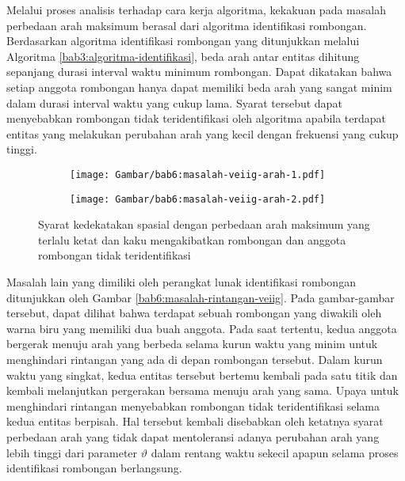 Melalui proses analisis terhadap cara kerja algoritma, kekakuan pada masalah perbedaan arah maksimum berasal dari algoritma identifikasi rombongan. Berdasarkan algoritma identifikasi rombongan yang ditunjukkan melalui Algoritma \ref{bab3:algoritma-identifikasi}, beda arah antar entitas dihitung sepanjang durasi interval waktu minimum rombongan. Dapat dikatakan bahwa setiap anggota rombongan hanya dapat memiliki beda arah yang sangat minim dalam durasi interval waktu yang cukup lama. Syarat tersebut dapat menyebabkan rombongan tidak teridentifikasi oleh algoritma apabila terdapat entitas yang melakukan perubahan arah yang kecil dengan frekuensi yang cukup tinggi.

\begin{figure}[t]
    \centering
    \captionsetup{width=.75\textwidth}
    \begin{subfigure}[b]{0.25\textwidth}
        \centering
        \texttt{[image: Gambar/bab6:masalah-veiig-arah-1.pdf]}
    \end{subfigure}
    \begin{subfigure}[b]{0.25\textwidth}
        \centering
        \texttt{[image: Gambar/bab6:masalah-veiig-arah-2.pdf]}
    \end{subfigure}
    \caption[Masalah perbedaan arah maksimum pada data VEIIG]{Syarat kedekatakan spasial dengan perbedaan arah maksimum yang terlalu ketat dan kaku mengakibatkan rombongan dan anggota rombongan tidak teridentifikasi}
    \label{bab6:masalah-veiig-arah}
\end{figure}

Masalah lain yang dimiliki oleh perangkat lunak identifikasi rombongan ditunjukkan oleh Gambar \ref{bab6:masalah-rintangan-veiig}. Pada gambar-gambar tersebut, dapat dilihat bahwa terdapat sebuah rombongan yang diwakili oleh warna biru yang memiliki dua buah anggota. Pada saat tertentu, kedua anggota bergerak menuju arah yang berbeda selama kurun waktu yang minim untuk menghindari rintangan yang ada di depan rombongan tersebut. Dalam kurun waktu yang singkat, kedua entitas tersebut bertemu kembali pada satu titik dan kembali melanjutkan pergerakan bersama menuju arah yang sama. Upaya untuk menghindari rintangan menyebabkan rombongan tidak teridentifikasi selama kedua entitas berpisah. Hal tersebut kembali disebabkan oleh ketatnya syarat perbedaan arah yang tidak dapat mentoleransi adanya perubahan arah yang lebih tinggi dari parameter $\vartheta$ dalam rentang waktu sekecil apapun selama proses identifikasi rombongan berlangsung.


